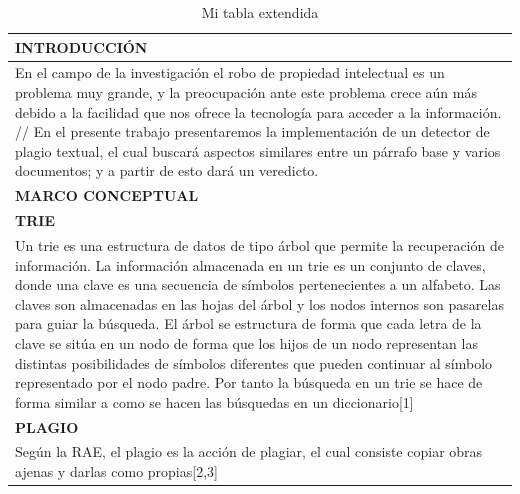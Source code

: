 \documentclass[9pt]{article}
\begin{document}
	\begin{longtable}{|p{15cm}|}
		\caption{Mi tabla extendida}\\
		\hline 
		\rowcolor{tablebackground}
		\color{white}\textbf{INTRODUCCIÓN}  \\
		\hline 
		 En el campo de la investigación el robo de  propiedad intelectual es un problema muy grande, y la preocupación ante este problema crece aún más debido a la facilidad que nos ofrece la tecnología para acceder a la información. //
		 En el presente trabajo presentaremos la implementación de un detector de plagio textual, el cual buscará aspectos similares entre un párrafo base y varios documentos; y a partir de esto dará un veredicto.\\
		\hline 
		\rowcolor{tablebackground}
		\color{white}\textbf{MARCO CONCEPTUAL}  \\
		\hline 
		\textbf{TRIE}  \\
		Un trie es una estructura de datos de tipo árbol que permite
		la recuperación de información.
		La información almacenada en un trie es un conjunto de claves, donde 
		una clave es una secuencia de símbolos pertenecientes a un alfabeto. 
		Las claves son almacenadas en las hojas del árbol y los nodos internos 
		son pasarelas para guiar la búsqueda. El árbol se estructura de forma 
		que cada letra de la clave se sitúa en un nodo de forma que los hijos
		de un nodo representan las distintas posibilidades de símbolos diferentes
		que pueden continuar al símbolo representado por el nodo padre. Por tanto 
		la búsqueda en un trie se hace de forma similar a como se hacen las búsquedas 
		en un diccionario[1]\\	
		
		\textbf{PLAGIO}  \\
		Según la RAE, el plagio es la acción de plagiar, el cual consiste copiar obras ajenas y darlas como propias[2,3]\\	
		 

\end{longtable}
\end{document}
